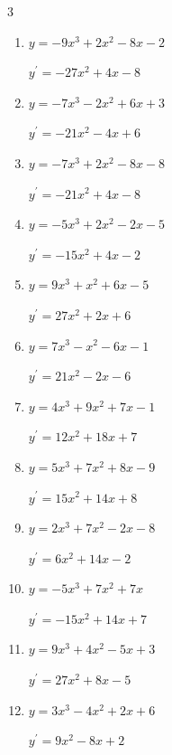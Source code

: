 \begin{multicols}{3}
\begin{enumerate}
        $\displaystyle y^{\prime}=21x^{2}+4x-3$

  \item $y=-9x^{3}+2x^{2}-8x-2$

        $\displaystyle y^{\prime}=-27x^{2}+4x-8$

  \item $y=-7x^{3}-2x^{2}+6x+3$

        $\displaystyle y^{\prime}=-21x^{2}-4x+6$

  \item $y=-7x^{3}+2x^{2}-8x-8$

        $\displaystyle y^{\prime}=-21x^{2}+4x-8$

  \item $y=-5x^{3}+2x^{2}-2x-5$

        $\displaystyle y^{\prime}=-15x^{2}+4x-2$

  \item $y=9x^{3}+x^{2}+6x-5$

        $\displaystyle y^{\prime}=27x^{2}+2x+6$

\columnbreak %

\resetques

  \item $y=7x^{3}-x^{2}-6x-1$

        $\displaystyle y^{\prime}=21x^{2}-2x-6$

  \item $y=4x^{3}+9x^{2}+7x-1$

        $\displaystyle y^{\prime}=12x^{2}+18x+7$

  \item $y=5x^{3}+7x^{2}+8x-9$

        $\displaystyle y^{\prime}=15x^{2}+14x+8$

  \item $y=2x^{3}+7x^{2}-2x-8$

        $\displaystyle y^{\prime}=6x^{2}+14x-2$

  \item $y=-5x^{3}+7x^{2}+7x$

        $\displaystyle y^{\prime}=-15x^{2}+14x+7$

  \item $y=9x^{3}+4x^{2}-5x+3$

        $\displaystyle y^{\prime}=27x^{2}+8x-5$

  \item $y=3x^{3}-4x^{2}+2x+6$

        $\displaystyle y^{\prime}=9x^{2}-8x+2$


\end{enumerate}
\end{multicols}
